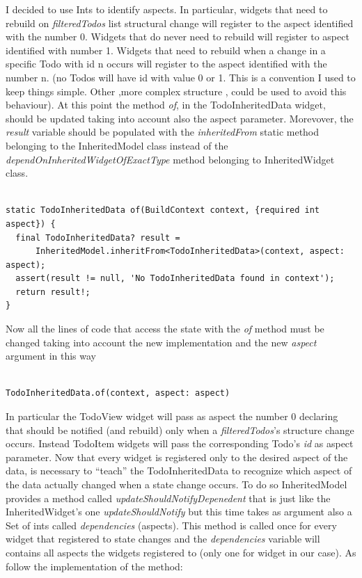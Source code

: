 I decided to use Ints to identify aspects. In particular, widgets that need to rebuild on \textit{filteredTodos} list structural change will register to the aspect identified with the number 0. Widgets that do never need to rebuild will register to aspect identified with number 1. Widgets that need to rebuild when a change in a specific Todo with id n occurs will register to the aspect identified with the number n. (no Todos will have id with value 0 or 1. This is a convention I used to keep things simple. Other ,more complex structure , could be used to avoid this behaviour). 
At this point the method \textit{of}, in the TodoInheritedData widget, should be updated taking into account also the aspect parameter. Morevover, the \textit{result} variable should be populated with the \textit{inheritedFrom  }static method belonging to the InheritedModel class instead of the \textit{dependOnInheritedWidgetOfExactType} method belonging to InheritedWidget class.
\mbox{}\\

\begin{code}
\begin{verbatim}

static TodoInheritedData of(BuildContext context, {required int aspect}) {
  final TodoInheritedData? result =
      InheritedModel.inheritFrom<TodoInheritedData>(context, aspect: aspect);
  assert(result != null, 'No TodoInheritedData found in context');
  return result!;
}
\end{verbatim}
\end{code}

Now all the lines of code that access the state with the \textit{of} method must be changed taking into account the new implementation and the new \textit{aspect} argument in this way
\mbox{}\\

\begin{code}
\begin{verbatim}

TodoInheritedData.of(context, aspect: aspect)
\end{verbatim}
\end{code}
In particular the TodoView widget will pass as aspect the number 0 declaring that should be notified (and rebuild) only when a \textit{filteredTodos}’s structure change occurs.
Instead TodoItem widgets will pass the corresponding Todo’s \textit{id} as aspect parameter.
Now that every widget is registered only to the desired aspect of the data, is necessary to “teach” the TodoInheritedData to recognize which aspect of the data actually changed when a state change occurs. To do so InheritedModel provides a method called \textit{updateShouldNotifyDepenedent} that is just like the InheritedWidget’s one \textit{updateShouldNotify }but this time takes as argument also a Set of ints called \textit{dependencies }  (aspects). This method is called once for every widget that registered to state changes and the \textit{dependencies }  variable will contains all aspects the widgets registered to (only one for widget in our case). As follow the implementation of the method:
\mbox{}\\

